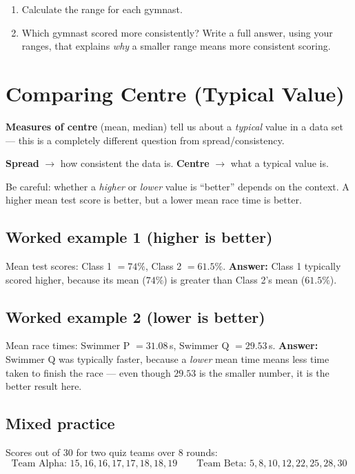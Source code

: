 \documentclass[11pt]{article}
\newcommand{\ans}{\hrulefill}
\newcommand{\anshere}{\par\vspace{0.8em}\noindent\ans\par\vspace{1.1em}}
\begin{document}
\begin{enumerate}[label=(\alph*)]
  \item Calculate the range for each gymnast.
  \anshere
  \item Which gymnast scored more consistently? Write a full answer, using your ranges, that
    explains \emph{why} a smaller range means more consistent scoring.
  \anshere
\end{enumerate}

\newpage

\section{Comparing Centre (Typical Value)}

\noindent \textbf{Measures of centre} (mean, median) tell us about a \emph{typical} value in a data
set --- this is a completely different question from spread/consistency.
\begin{center}
\textbf{Spread} $\longrightarrow$ how consistent the data is. \qquad
\textbf{Centre} $\longrightarrow$ what a typical value is.
\end{center}
\noindent Be careful: whether a \emph{higher} or \emph{lower} value is ``better'' depends on the
context. A higher mean test score is better, but a lower mean race time is better.

\subsection*{Worked example 1 (higher is better)}
\noindent Mean test scores: Class 1 $=74\%$, Class 2 $=61.5\%$.
\noindent\textbf{Answer:} Class 1 typically scored higher, because its mean ($74\%$) is greater
than Class 2's mean ($61.5\%$).

\vspace{0.4em}
\subsection*{Worked example 2 (lower is better)}
\noindent Mean race times: Swimmer P $=31.08$\,s, Swimmer Q $=29.53$\,s.
\noindent\textbf{Answer:} Swimmer Q was typically faster, because a \emph{lower} mean time means
less time taken to finish the race --- even though $29.53$ is the smaller number, it is the better
result here.

\vspace{0.6em}
\subsection*{Mixed practice}
\noindent Scores out of 30 for two quiz teams over 8 rounds:
\[
  \text{Team Alpha: } 15,16,16,17,17,18,18,19 \qquad
  \text{Team Beta: } 5,8,10,12,22,25,28,30
\]
\end{document}
